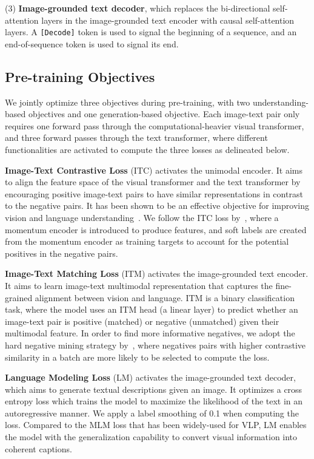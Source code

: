 \vspace{-0.8ex}
(3) \textbf{Image-grounded text decoder}, which replaces the bi-directional self-attention layers in the image-grounded text encoder with causal self-attention layers. A \texttt{[Decode]} token is used to signal the beginning of a sequence, and an end-of-sequence token is used to signal its end.


\vspace{-1ex}
\subsection{Pre-training Objectives}
\vspace{-0.5ex}
We jointly optimize three objectives during pre-training,
with two understanding-based objectives and one generation-based objective.
Each image-text pair only requires one forward pass through the computational-heavier visual transformer,
and three forward passes through the text transformer,
where different functionalities are activated to compute the three losses as delineated below.

\noindent\textbf{Image-Text Contrastive Loss} (ITC) activates the unimodal encoder. It aims to align the feature space of the visual transformer and the text transformer by encouraging positive image-text pairs to have similar representations in contrast to the negative pairs. 
It has been shown to be an effective objective for improving vision and language understanding~\cite{clip, ALBEF}.
We follow the ITC loss by~\citet{ALBEF},
where a momentum encoder is introduced to produce features,
and soft labels are created from the momentum encoder as training targets to account for the potential positives in the negative pairs. 

\noindent\textbf{Image-Text Matching Loss} (ITM) activates the image-grounded text encoder.
It aims to learn image-text multimodal representation that captures the fine-grained alignment between vision and language. 
ITM is a binary classification task,
where the model uses an ITM head (a linear layer) to predict whether an image-text pair is positive (matched) or negative (unmatched) given their multimodal feature.
In order to find more informative negatives,
we adopt the hard negative mining strategy by~\citet{ALBEF},
where negatives pairs with higher contrastive similarity in a batch are more likely to be selected to compute the loss.

\noindent\textbf{Language Modeling Loss} (LM) activates the image-grounded text decoder,
which aims to generate textual descriptions given an image.
It optimizes a cross entropy loss which trains the model to maximize the likelihood of the text in an autoregressive manner.
We apply a label smoothing of 0.1 when computing the loss.
Compared to the MLM loss that has been widely-used for VLP,
LM enables the model with the generalization capability to convert visual information into coherent captions.



